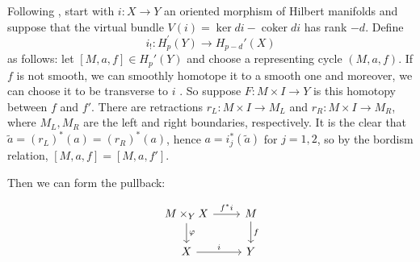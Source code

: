 \documentclass[reqno]{amsart}
\theoremstyle{definition}
\theoremstyle{remark}
\DeclareMathOperator{\coker}{coker}
\begin{document}
Following \cite[§3.3]{Chataur}, 
start with $i \colon X \to Y$ an oriented morphism of
Hilbert manifolds and suppose
that the virtual bundle $V(i) = \ker di - \coker di$ 
has rank $-d$. Define
\[
i_! \colon H_p^{'}(Y) \to H_{p-d}'(X)
\] 
as follows:
let $\left[ M,a,f \right] \in H_p'(Y)$ and choose
a representing cycle $\left( M, a, f \right) $.
If $f$ is not smooth, we can smoothly homotope it to a smooth
one \cite[§2.1.6]{Chataur} and moreover, we can choose
it to be transverse to $i$ \cite[Theorem 2.2.4]{Chataur}.
So suppose $F \colon M \times I \to Y$ is this homotopy between
$f$ and $f'$. There are retractions
$r_L \colon M \times I \to M_L$ and
$r_R \colon M \times I \to M_R$, where $M_L,M_R$ are the left and
right boundaries, respectively. 
It is the clear that
$\tilde{a} = (r_L)^{*}(a) = (r_R)^{*}(a)$, hence
$a = i_j^{*}(\tilde{a})$ for $j=1,2$, so
by  the bordism relation,
$\left[ M,a,f \right] = \left[ M,a,f' \right] $.


Then we can form the pullback:

\begin{equation*}
\begin{tikzcd}
    M \times_Y X \ar[r, "f^{*}i"] \ar[d, "\varphi "] & M \ar[d, "f"] \\
    X \ar[r, "i"] & Y
\end{tikzcd}
\end{equation*}
\end{document}
